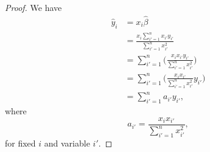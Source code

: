 
\begin{proof}
    We have
    \begin{equation*}
        \begin{split}
            \hat{y}_i &= x_i \hat{\beta} \\
                      &= \frac{x_i \sum_{i'=1}^{n} x_{i'} y_{i'}}{\sum_{i'=1}^{n} 
                          x_{i'}^{2}} \\
                      &= \sum_{i'=1}^n \Biggl(\frac{x_i x_{i'} y_{i'}}
                          {\sum_{i'=1}^{n} x_{i'}^{2}} \Biggr) \\
                      &= \sum_{i'=1}^n \Biggl(\frac{x_i x_{i'}}
                          {\sum_{i'=1}^{n} x_{i'}^{2}} y_{i'}\Biggr) \\
                      &= \sum_{i'=1}^n a_{i'} y_{i'},
        \end{split}
    \end{equation*}
    where
    \[
        a_{i'} = \frac{x_i x_{i'}}{\sum_{i'=1}^{n} x_{i'}^{2}},
    \]
    for fixed $i$ and variable $i'$.
\end{proof}
